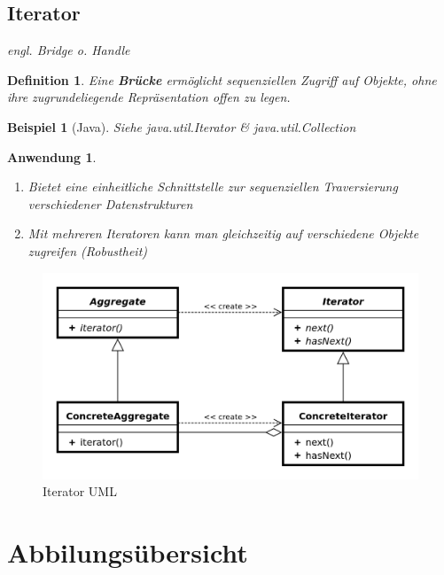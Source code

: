 \documentclass[a4paper]{article}
\theoremstyle{break}
\newtheorem{defi}{Definition}[section]
\newtheorem{ex}{Beispiel}[section]
\newtheorem{why}{Anwendung}[section]
\begin{document}
\subsection{Iterator}
\textit{engl. Bridge o. Handle}
\begin{defi}
	Eine \textbf{Brücke} ermöglicht sequenziellen Zugriff auf Objekte, ohne ihre zugrundeliegende Repräsentation offen zu legen.
\end{defi}
\begin{ex}[Java]
	Siehe java.util.Iterator \& java.util.Collection
\end{ex}
\begin{why}
	\begin{enumerate}
		\item Bietet eine einheitliche Schnittstelle zur sequenziellen Traversierung verschiedener Datenstrukturen
		\item Mit mehreren Iteratoren kann man gleichzeitig auf verschiedene Objekte zugreifen (Robustheit)
	\end{enumerate}
\end{why}
\begin{figure}[H]
	\centering
	\includegraphics[width=\textwidth]{../diagrams/uml/IteratorPattern.png}
	\caption{Iterator UML}
\end{figure}


\newpage
\appendix
\section{Abbilungsübersicht}
\listoffigures


	
\end{document}
